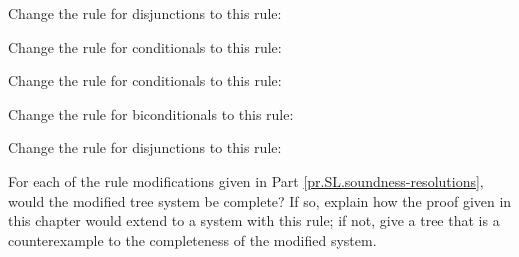 \begin{earg}
\item Change the rule for disjunctions to this rule:

\item Change the rule for conditionals to this rule:

\item Change the rule for conditionals to this rule:

\item Change the rule for biconditionals to this rule:

\item Change the rule for disjunctions to this rule:

\end{earg}

\problempart
\label{pr.SL.completenessresolutions}
For each of the rule modifications given in Part \ref{pr.SL.soundness-resolutions}, would the modified tree system be complete? If so, explain how the proof given in this chapter would extend to a system with this rule; if not, give a tree that is a counterexample to the completeness of the modified system.

\fi 
